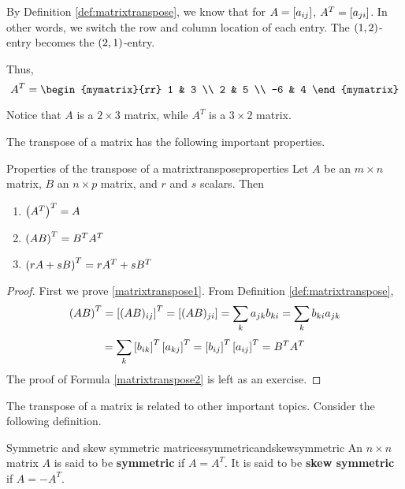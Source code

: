 \begin{solution}
By Definition \ref{def:matrixtranspose}, we know that for $A = \left[a_{ij} \right]$, 
$A^T = \left[a_{ji} \right]$. In other words, we switch the row and column
location of each entry. The $\left(1, 2 \right)$-entry becomes the $\left(2,1 \right)$-entry.

Thus, 
\begin{equation*}
A^T = 
 \begin{mymatrix}{rr}
1 & 3 \\
2 & 5 \\
-6 & 4
\end{mymatrix} 
\end{equation*}

Notice that $A$ is a $2 \times 3$ matrix, while $A^T$ is a $3 \times 2$ matrix. 
\end{solution}

The transpose of a matrix has the following important properties.

\begin{lemma}{Properties of the transpose of a matrix}{transposeproperties}
Let $A$ be an $m\times n$ matrix, $B$ an $n\times p$ matrix, and $r$ and $s$ scalars. Then
\begin{enumerate}
\item
$\left(A^{T}\right)^{T} = A$
\item
$\left(AB\right) ^{T}=B^{T}A^{T} $ \label{matrixtranspose1}
\item
$\left(rA+ sB\right) ^{T}=rA^{T}+ sB^{T}$  \label{matrixtranspose2}
\end{enumerate}
\end{lemma}

\begin{proof}
First we prove \ref{matrixtranspose1}. From Definition \ref{def:matrixtranspose},
\begin{equation*}
\left(AB\right)^{T} = \left[(AB) _{ij} \right] ^{T}=\left[(AB)_{ji} \right]=\sum_{k}a_{jk}b_{ki}= \sum_{k}b_{ki}a_{jk} 
\end{equation*}
\begin{equation*}
= \sum_{k}\left[b_{ik}\right]^{T}\left[
a_{kj}\right]^{T}=\left[b_{ij}\right] ^{T} \left[a_{ij}\right]^{T} = B^{T}A^{T} 
\end{equation*}
The proof of Formula \ref{matrixtranspose2} is left as an exercise. 
\end{proof}

The transpose of a matrix is related to other important topics. Consider the following definition.  

\begin{definition}{Symmetric and skew symmetric matrices}{symmetricandskewsymmetric}
An $n\times n$ matrix $A$ is said to be
\textbf{symmetric} if $A=A^{T}.$ It is said to be
\textbf{skew symmetric} if $A=-A^{T}.$
\end{definition}

